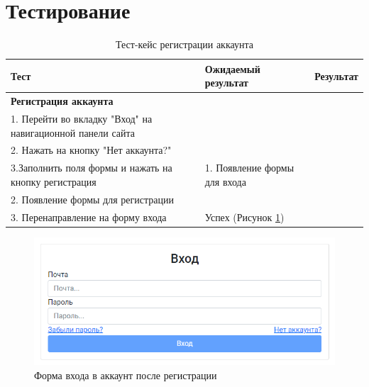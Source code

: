 \section{Тестирование}
\label{sec:testing}



\begin{table}[ht]
	\caption{Тест-кейс регистрации аккаунта}
	\label{table:testing:func:test1}
	\centering
	  \begin{tabular}{| >{\raggedright}m{} 
					  | >{\raggedright}m{} 
					  | >{\raggedright\arraybackslash}m{}|}
	  \hline Тест & Ожидаемый результат  & Результат \\
	  \hline \textbf{Регистрация аккаунта} \\ 1. Перейти во вкладку "Вход" на навигационной панели сайта \\ 2. Нажать на кнопку "Нет аккаунта?" \\ 3.Заполнить поля формы и нажать на кнопку регистрация & 1. Появление формы для входа \\ 2. Появление формы для регистрации \\ 3. Перенаправление на форму входа & Успех (Рисунок \ref*{sec:testing:func:register})\\
	  \hline
	  \end{tabular}
\end{table}

\begin{figure}[ht]
	\centering
	  \includegraphics[scale=0.8]{attachments/register.png}  
	  \caption{ Форма входа в аккаунт после регистрации }
	  \label{sec:testing:func:register}
\end{figure}

